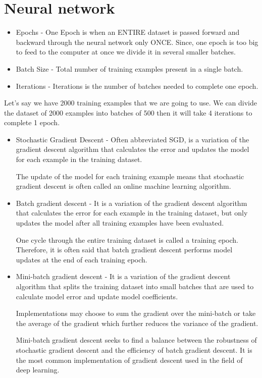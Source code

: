 \documentclass{book}
\begin{document}
\chapter{Neural network}
\begin{itemize}
\item Epochs - One Epoch is when an ENTIRE dataset is passed forward and backward through the neural network only ONCE. Since, one epoch is too big to feed to the computer at once we divide it in several smaller batches.
\item Batch Size - Total number of training examples present in a single batch.
\item Iterations - Iterations is the number of batches needed to complete one epoch.
\end{itemize}
Let's say we have 2000 training examples that we are going to use. We can divide the dataset of 2000 examples into batches of 500 then it will take 4 iterations to complete 1 epoch.

\begin{itemize}
\item Stochastic Gradient Descent - Often abbreviated SGD, is a variation of the gradient descent algorithm that calculates the error and updates the model for each example in the training dataset.

The update of the model for each training example means that stochastic gradient descent is often called an online machine learning algorithm.
\item Batch gradient descent - It is a variation of the gradient descent algorithm that calculates the error for each example in the training dataset, but only updates the model after all training examples have been evaluated.

One cycle through the entire training dataset is called a training epoch. Therefore, it is often said that batch gradient descent performs model updates at the end of each training epoch.
\item Mini-batch gradient descent - It is a variation of the gradient descent algorithm that splits the training dataset into small batches that are used to calculate model error and update model coefficients.

Implementations may choose to sum the gradient over the mini-batch or take the average of the gradient which further reduces the variance of the gradient.

Mini-batch gradient descent seeks to find a balance between the robustness of stochastic gradient descent and the efficiency of batch gradient descent. It is the most common implementation of gradient descent used in the field of deep learning.
\end{itemize}
\end{document}

